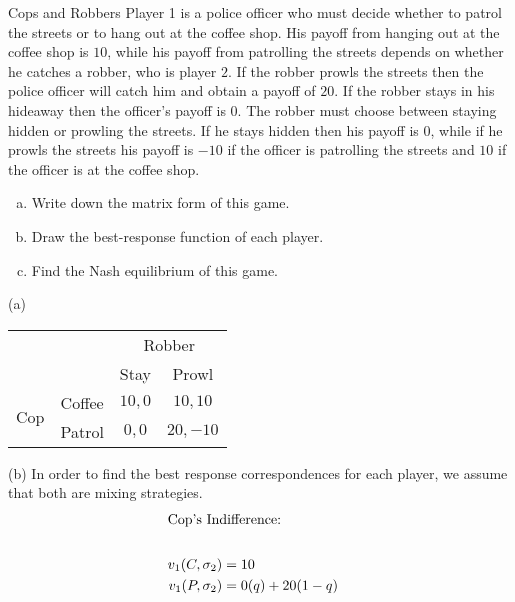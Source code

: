 \documentclass[8pt]{extarticle}
\title{}
\author{Avinash Iyer}
\date{}
\begin{document}
  \begin{problem}{Cops and Robbers}
    Player 1 is a police officer who must decide whether to patrol the streets or to hang out at the coffee shop. His payoff from hanging out at the coffee shop is $10$, while his payoff from patrolling the streets depends on whether he catches a robber, who is player $2$. If the robber prowls the streets then the police officer will catch him and obtain a payoff of $20$. If the robber stays in his hideaway then the officer's payoff is $0$. The robber must choose between staying hidden or prowling the streets. If he stays hidden then his payoff is $0$, while if he prowls the streets his payoff is $-10$ if the officer is patrolling the streets and $10$ if the officer is at the coffee shop.
    \begin{enumerate}[(a)]
      \item Write down the matrix form of this game.
      \item Draw the best-response function of each player.
      \item Find the Nash equilibrium of this game.
    \end{enumerate}
    \tcblower
    \begin{problem}{(a)}
      \begin{center}
        \renewcommand{\arraystretch}{1.5}
        \begin{tabular}{cc|c|c|}
          &\multicolumn{1}{c}{} & \multicolumn{2}{c}{Robber}\\
          &\multicolumn{1}{c}{} & \multicolumn{1}{c}{Stay} & \multicolumn{1}{c}{Prowl} \\
          \cline{3-4}
          \multirow{2}{1em}{Cop} & Coffee & $10,0$ & $10,10$\\
          \cline{3-4}
                                 & Patrol & $0,0$ & $20,-10$\\
                                 \cline{3-4}
        \end{tabular}
      \end{center}
    \end{problem}
    \begin{problem}{(b)}
      In order to find the best response correspondences for each player, we assume that both are mixing strategies.
      \begin{align*}
        \shortintertext{Cop's Indifference:}\\
        v_1(C,\sigma_2) &= 10\\
        v_1(P,\sigma_2) &= 0(q) + 20 (1-q)\\

\end{align*}
\end{problem}
\end{problem}
\end{document}
